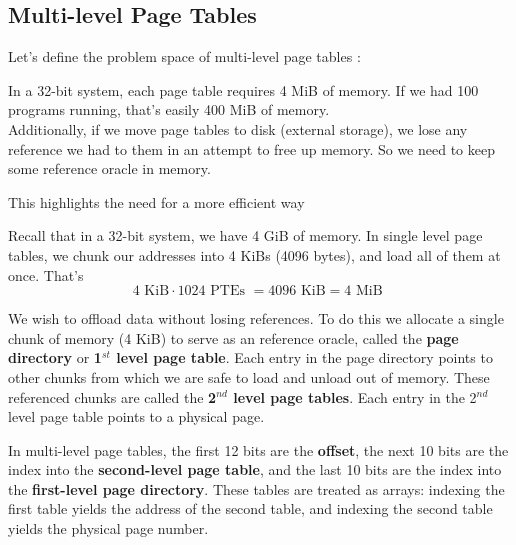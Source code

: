 \subsection{Multi-level Page Tables}

\noindent
Let's define the problem space of multi-level page tables \cite{neso_vm_multilevel}:
\begin{theo}

    In a 32-bit system, each page table requires 4 MiB of memory. If we had 100 programs running, that's easily 400 MiB of memory.\\

    \noindent
    Additionally, if we move page tables to disk (external storage), we lose any reference we had to them in an attempt to free up memory. So we need to keep some reference oracle in memory.
\end{theo}

\noindent
This highlights the need for a more efficient way 
\begin{Def}

    Recall that in a 32-bit system, we have 4 GiB of memory. In single level page tables, we chunk our addresses into 4 KiBs (4096 bytes), 
    and load all of them at once. That's
    $$4 \text{ KiB} \cdot 1024 \text{ PTEs } = 4096 \text{ KiB} = 4 \text{ MiB }$$

    \noindent
    We wish to offload data without losing references. To do this we allocate a single chunk of memory (4 KiB) to 
    serve as an reference oracle, called the \textbf{page directory} or \textbf{1$^{st}$ level page table}. Each entry in the page directory points to other chunks from which we are safe to load and unload out of memory.
    These referenced chunks are called the \textbf{2$^{nd}$ level page tables}. Each entry in the 2$^{nd}$ level page table points to a physical page.
\end{Def}

\begin{Def}

    In multi-level page tables, the first 12 bits are the \textbf{offset}, the next 10 bits are the index into the \textbf{second-level page table}, and the last 10 bits are the index into the \textbf{first-level page directory}. These tables are treated as arrays: indexing the first table yields the address of the second table, and indexing the second table yields the physical page number.
\end{Def}

